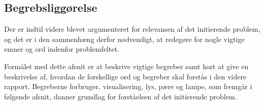 \subsection{Begrebsliggørelse}
Der er indtil videre blevet  argumenteret for relevansen af det initierende problem, og det er i den sammenhæng derfor nødvendigt, at redegøre for nogle vigtige emner og ord indenfor problemfeltet. 

Formålet med dette afsnit er at beskrive vigtige begreber samt kort at give en beskrivelse af, hvordan de forskellige ord og begreber skal forstås i den videre rapport. Begreberne forbruger, visualisering, lys, pære og lampe, som fremgår i følgende afsnit, danner grundlag for forståelsen af det initierende problem. 




 


